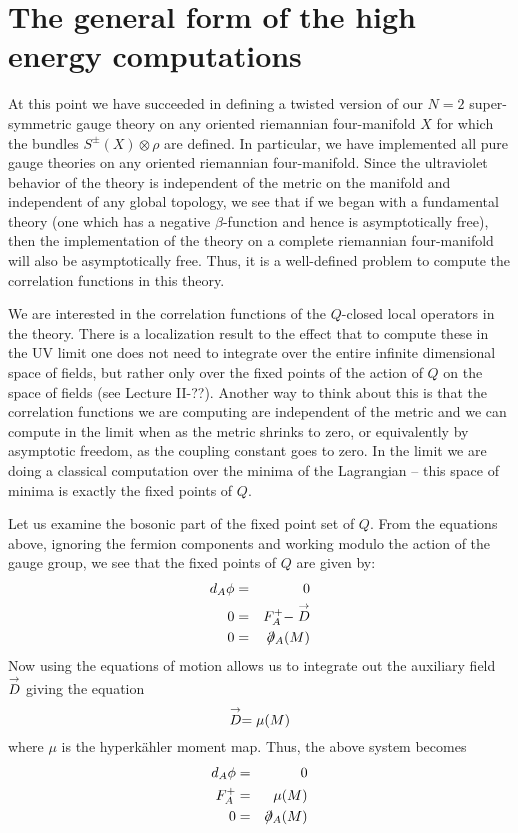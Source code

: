 \documentclass[10pt]{article}
\def\cancel#1#2{\ooalign{$\hfil#1\mkern1mu/\hfil$\crcr$#1#2$}}
\def\dirac{\mathpalette\cancel\partial}
\begin{document}
\section{The general form of the high energy computations}

At this point we have succeeded in defining a twisted version of our
$N=2$ super-symmetric gauge theory on any oriented riemannian
four-manifold $X$ for which the bundles $S^\pm(X)\otimes \rho$ are
defined. 
In particular, we have implemented all pure gauge theories  on any
oriented riemannian four-manifold.  
Since the ultraviolet behavior of the theory is independent of the
metric on the manifold and independent of any global topology, we see
that if we began with a fundamental theory (one which has a negative 
$\beta$-function and hence is asymptotically free), then the
implementation of the theory on a complete 
riemannian four-manifold will also be asymptotically free.
Thus, it is a well-defined problem to compute the
correlation functions in this theory.

We are interested in the correlation functions of the
$Q$-closed local operators in the theory.
There is a localization result to the effect that to compute these in
the UV limit one does not need to integrate over the entire infinite
dimensional space of fields, but rather only over the fixed points of
the action of $Q$ on the space of fields (see Lecture II-??).
Another way to think about this is that the correlation functions we
are computing are independent of the metric and we can
compute in the limit when as the metric shrinks to zero, or
equivalently by asymptotic freedom, as the coupling constant goes to
zero.
In the limit we are doing a classical computation over the minima of
the Lagrangian -- this space of minima is exactly the fixed points of
$Q$. 

Let us examine the bosonic part of the fixed point set of $Q$.
{}From the equations above, ignoring the fermion components and working
modulo the action of the gauge group, we see that
the fixed points of $Q$ are given by:
\begin{eqnarray*}
d_A\phi & = & 0  \\
0 & = & F^+_A-\buildrel\rightarrow\over D \label{eqn2} \\
0 & = & \dirac_A(M) 
\end{eqnarray*}
Now using the equations of motion allows us to integrate out the
auxiliary field $\buildrel\rightarrow\over D$ giving the equation
$$\buildrel\rightarrow\over D=\mu(M)$$
where $\mu$ is the hyperk\"ahler moment map.
Thus,  the above system becomes
\begin{eqnarray}
d_A\phi & = & 0  \label{triveqn} \\
F^+_A  & = & \mu(M) \label{SWeqn1} \\
0 & = & \dirac_A(M) \label{diraceqn}
\end{eqnarray}
\end{document}
